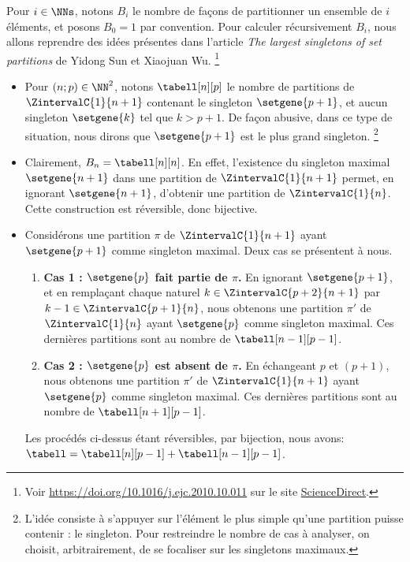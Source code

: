 Pour $i \in \NNs$, notons $B_i$ le nombre de façons de partitionner un ensemble de $i$ éléments, et posons $B_0 = 1$ par convention.
Pour calculer récursivement $B_i$, nous allons reprendre des idées présentes dans l'article
\emph{\og The largest singletons of set partitions \fg}
de Yidong Sun et Xiaojuan Wu.%
    \footnote{
    	Voir
	\url{https://doi.org/10.1016/j.ejc.2010.10.011}
	sur le site \href{https://www.sciencedirect.com/}{ScienceDirect}.
}
%
\begin{itemize}
    \item Pour $(n ; p) \in \NN^2$, notons $\tabell[n][p]$ le nombre de partitions de $\ZintervalC{1}{n+1}$ contenant le singleton $\setgene{p+1}$, et aucun singleton $\setgene{k}$ tel que $k > p+1$.
    De façon abusive, dans ce type de situation, nous dirons que $\setgene{p+1}$ est le plus grand singleton.%
    \footnote{
        L’idée consiste à s’appuyer sur l’élément le plus simple qu’une partition puisse contenir : le singleton.
        Pour restreindre le nombre de cas à analyser, on choisit, arbitrairement, de se focaliser sur les singletons maximaux.
    }


    \item Clairement, $B_n = \tabell[n][n]$.
    En effet,
    l'existence du singleton maximal $\setgene{n+1}$ dans une partition de $\ZintervalC{1}{n+1}$ permet, en ignorant $\setgene{n+1}$, d'obtenir une partition de $\ZintervalC{1}{n}$. Cette construction est réversible, donc bijective.


    \item Considérons une partition $\pi$ de $\ZintervalC{1}{n+1}$ ayant $\setgene{p+1}$ comme singleton maximal.
    Deux cas se présentent à nous.
    \begin{enumerate}
        \item \textbf{\boldmath Cas 1 : $\setgene{p}$ fait partie de $\pi$.}
        En ignorant $\setgene{p+1}$, 
        et
        en remplaçant chaque naturel $k \in \ZintervalC{p+2}{n+1}$ par $k-1 \in \ZintervalC{p+1}{n}$,
        nous obtenons une partition $\pi'$ de $\ZintervalC{1}{n}$ ayant $\setgene{p}$ comme singleton maximal.
        Ces dernières partitions sont au nombre de $\tabell[n-1][p-1]$.


        \item \textbf{\boldmath Cas 2 : $\setgene{p}$ est absent de $\pi$.}
        En échangeant $p$ et $(p+1)$,
        nous obtenons une partition $\pi'$ de $\ZintervalC{1}{n+1}$ ayant $\setgene{p}$ comme singleton maximal. 
        Ces dernières partitions sont au nombre de $\tabell[n+1][p-1]$.
    \end{enumerate}
    Les procédés ci-dessus étant réversibles, par bijection, nous avons:
    $\tabell = \tabell[n][p-1] + \tabell[n-1][p-1]$.



\end{itemize}

